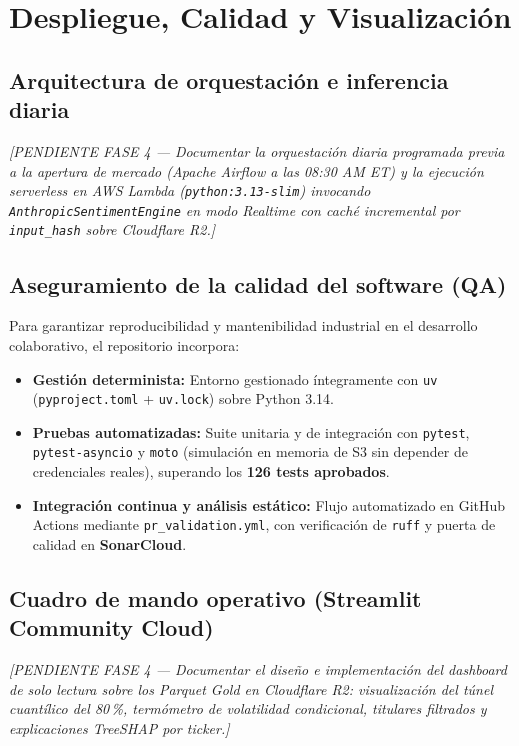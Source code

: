 \chapter{Despliegue, Calidad y Visualización}

\section{Arquitectura de orquestación e inferencia diaria}
\textit{[PENDIENTE FASE 4 --- Documentar la orquestación diaria programada previa a la apertura de mercado (Apache Airflow a las 08:30 AM ET) y la ejecución \textit{serverless} en AWS Lambda (\texttt{python:3.13-slim}) invocando \texttt{AnthropicSentimentEngine} en modo \textit{Realtime} con caché incremental por \texttt{input\_hash} sobre Cloudflare R2.]}

\section{Aseguramiento de la calidad del software (QA)}
Para garantizar reproducibilidad y mantenibilidad industrial en el desarrollo colaborativo, el repositorio incorpora:
\begin{itemize}
    \item \textbf{Gestión determinista:} Entorno gestionado íntegramente con \texttt{uv} (\texttt{pyproject.toml} + \texttt{uv.lock}) sobre Python 3.14.
    \item \textbf{Pruebas automatizadas:} Suite unitaria y de integración con \texttt{pytest}, \texttt{pytest-asyncio} y \texttt{moto} (simulación en memoria de S3 sin depender de credenciales reales), superando los \textbf{126 tests aprobados}.
    \item \textbf{Integración continua y análisis estático:} Flujo automatizado en GitHub Actions mediante \texttt{pr\_validation.yml}, con verificación de \texttt{ruff} y puerta de calidad en \textbf{SonarCloud}.
\end{itemize}

\section{Cuadro de mando operativo (Streamlit Community Cloud)}
\textit{[PENDIENTE FASE 4 --- Documentar el diseño e implementación del dashboard de solo lectura sobre los Parquet Gold en Cloudflare R2: visualización del túnel cuantílico del 80\,\%, termómetro de volatilidad condicional, titulares filtrados y explicaciones TreeSHAP por ticker.]}
